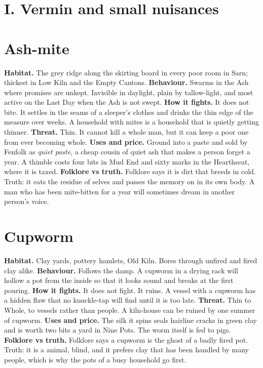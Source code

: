 \documentclass{design/chronicle}
\begin{document}
\section*{I. Vermin and small nuisances}

\section*{Ash-mite}

\textbf{Habitat.} The grey ridge along the skirting board in every poor room in Sarn; thickest in Low Kiln and the Empty Cantons. \textbf{Behaviour.} Swarms in the Ash where promises are unkept. Invisible in daylight, plain by tallow-light, and most active on the Last Day when the Ash is not swept. \textbf{How it fights.} It does not bite. It settles in the seams of a sleeper’s clothes and drinks the thin edge of the measure over weeks. A household with mites is a household that is quietly getting thinner. \textbf{Threat.} Thin. It cannot kill a whole man, but it can keep a poor one from ever becoming whole. \textbf{Uses and price.} Ground into a paste and sold by Fenfolk as \emph{quiet paste}, a cheap cousin of quiet ash that makes a person forget a year. A thimble costs four bits in Mud End and sixty marks in the Hearthseat, where it is taxed. \textbf{Folklore vs truth.} Folklore says it is dirt that breeds in cold. Truth: it eats the residue of selves and passes the memory on in its own body. A man who has been mite-bitten for a year will sometimes dream in another person’s voice.

\section*{Cupworm}

\textbf{Habitat.} Clay yards, pottery hamlets, Old Kiln. Bores through unfired and fired clay alike. \textbf{Behaviour.} Follows the damp. A cupworm in a drying rack will hollow a pot from the inside so that it looks sound and breaks at the first pouring. \textbf{How it fights.} It does not fight. It ruins. A vessel with a cupworm has a hidden flaw that no knuckle-tap will find until it is too late. \textbf{Threat.} Thin to Whole, to vessels rather than people. A kiln-house can be ruined by one summer of cupworm. \textbf{Uses and price.} The silk it spins seals hairline cracks in green clay and is worth two bits a yard in Nine Pots. The worm itself is fed to pigs. \textbf{Folklore vs truth.} Folklore says a cupworm is the ghost of a badly fired pot. Truth: it is a animal, blind, and it prefers clay that has been handled by many people, which is why the pots of a busy household go first.
\end{document}
